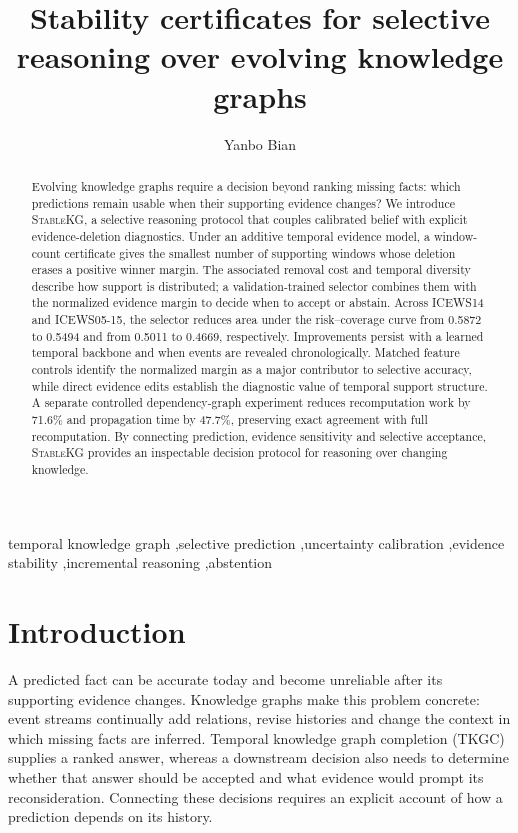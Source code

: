 \documentclass[preprint,12pt]{elsarticle}
\newcommand{\StableKG}{\textsc{StableKG}}
\begin{document}
\begin{frontmatter}

\title{Stability certificates for selective reasoning over evolving knowledge graphs}

\author[inst1]{Yanbo Bian}
\address[inst1]{Department of Computer Science, Weihai International College, Beijing Jiaotong University, Weihai, China}

\begin{abstract}
Evolving knowledge graphs require a decision beyond ranking missing facts: which predictions remain usable when their supporting evidence changes? We introduce \StableKG{}, a selective reasoning protocol that couples calibrated belief with explicit evidence-deletion diagnostics. Under an additive temporal evidence model, a window-count certificate gives the smallest number of supporting windows whose deletion erases a positive winner margin. The associated removal cost and temporal diversity describe how support is distributed; a validation-trained selector combines them with the normalized evidence margin to decide when to accept or abstain. Across ICEWS14 and ICEWS05-15, the selector reduces area under the risk--coverage curve from 0.5872 to 0.5494 and from 0.5011 to 0.4669, respectively. Improvements persist with a learned temporal backbone and when events are revealed chronologically. Matched feature controls identify the normalized margin as a major contributor to selective accuracy, while direct evidence edits establish the diagnostic value of temporal support structure. A separate controlled dependency-graph experiment reduces recomputation work by 71.6\% and propagation time by 47.7\%, preserving exact agreement with full recomputation. By connecting prediction, evidence sensitivity and selective acceptance, \StableKG{} provides an inspectable decision protocol for reasoning over changing knowledge.
\end{abstract}

\begin{keyword}
temporal knowledge graph \sep selective prediction \sep uncertainty calibration \sep evidence stability \sep incremental reasoning \sep abstention
\end{keyword}

\end{frontmatter}

\section{Introduction}
A predicted fact can be accurate today and become unreliable after its supporting evidence changes. Knowledge graphs make this problem concrete: event streams continually add relations, revise histories and change the context in which missing facts are inferred. Temporal knowledge graph completion (TKGC) supplies a ranked answer, whereas a downstream decision also needs to determine whether that answer should be accepted and what evidence would prompt its reconsideration. Connecting these decisions requires an explicit account of how a prediction depends on its history.
\end{document}
